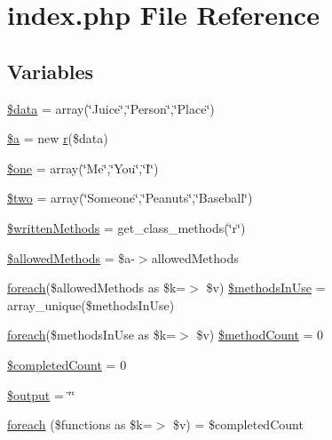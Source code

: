 \hypertarget{index_8php}{\section{index.\-php File Reference}
\label{index_8php}
}
\subsection*{Variables}
\begin{DoxyCompactItemize}
\item 
\hyperlink{index_8php_a6efc15b5a2314dd4b5aaa556a375c6d6}{\$data} = array(\char`\"{}Juice\char`\"{},\char`\"{}Person\char`\"{},\char`\"{}Place\char`\"{})
\item 
\hyperlink{index_8php_acebf83966ef6d7e5645a6b62ba368f9f}{\$a} = new \hyperlink{classr}{r}(\$data)
\item 
\hyperlink{index_8php_a95601f0019d098a2b40f33f5939e799b}{\$one} = array(\char`\"{}Me\char`\"{},\char`\"{}You\char`\"{},\char`\"{}I\char`\"{})
\item 
\hyperlink{index_8php_a6c7519bde09ff89a11a474606e57547f}{\$two} = array(\char`\"{}Someone\char`\"{},\char`\"{}Peanuts\char`\"{},\char`\"{}Baseball\char`\"{})
\item 
\hyperlink{index_8php_a2e64f0494f7eccf90168af7f67198650}{\$written\-Methods} = get\-\_\-class\-\_\-methods(\char`\"{}r\char`\"{})
\item 
\hyperlink{index_8php_ab278eba7cab5341dacdccecd7a2cc2df}{\$allowed\-Methods} = \$a-\/$>$allowed\-Methods
\item 
\hyperlink{index_8php_a1b77627b646134ac307a24cf90261ebb}{foreach}(\$allowed\-Methods as \$k=$>$ \$v) \hyperlink{index_8php_a1c475c0c53206fb15c4c3028bb7d5c7c}{\$methods\-In\-Use} = array\-\_\-unique(\$methods\-In\-Use)
\item 
\hyperlink{index_8php_a1b77627b646134ac307a24cf90261ebb}{foreach}(\$methods\-In\-Use as \$k=$>$ \$v) \hyperlink{index_8php_a56c1b7384519355df73a254a12f0bae3}{\$method\-Count} = 0
\item 
\hyperlink{index_8php_a51c734a41c7747051953ec3d78dd1c5b}{\$completed\-Count} = 0
\item 
\hyperlink{index_8php_a73004ce9cd673c1bfafd1dc351134797}{\$output} = \char`\"{}\char`\"{}
\item 
\hyperlink{index_8php_a1b77627b646134ac307a24cf90261ebb}{foreach} (\$functions as \$k=$>$ \$v) = \$completed\-Count
\end{DoxyCompactItemize}



